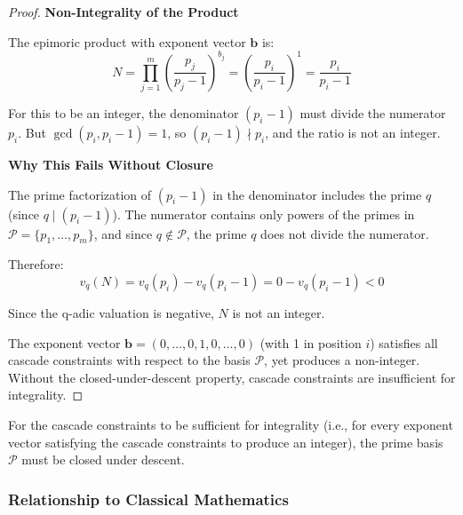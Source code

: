 \begin{proof}
\noindent \textbf{Non-Integrality of the Product}

The epimoric product with exponent vector $\mathbf{b}$ is:
\begin{equation}
N = \prod_{j=1}^m \left(\frac{p_j}{p_j - 1}\right)^{b_j} = \left(\frac{p_i}{p_i - 1}\right)^1 = \frac{p_i}{p_i - 1}
\end{equation}

For this to be an integer, the denominator $(p_i - 1)$ must divide the numerator $p_i$. But $\gcd(p_i, p_i - 1) = 1$, so $(p_i - 1) \nmid p_i$, and the ratio is not an integer.

\noindent \textbf{Why This Fails Without Closure}

The prime factorization of $(p_i - 1)$ in the denominator includes the prime $q$ (since $q \mid (p_i - 1)$). The numerator contains only powers of the primes in $\mathcal{P} = \{p_1, \ldots, p_m\}$, and since $q \notin \mathcal{P}$, the prime $q$ does not divide the numerator.

Therefore:
\begin{equation}
v_q(N) = v_q(p_i) - v_q(p_i - 1) = 0 - v_q(p_i - 1) < 0
\end{equation}

Since the q-adic valuation is negative, $N$ is not an integer.

\noindent The exponent vector $\mathbf{b} = (0, \ldots, 0, 1, 0, \ldots, 0)$ (with 1 in position $i$) satisfies all cascade constraints with respect to the basis $\mathcal{P}$, yet produces a non-integer. Without the closed-under-descent property, cascade constraints are insufficient for integrality.

\end{proof}

\begin{corollary}

For the cascade constraints to be sufficient for integrality (i.e., for every exponent vector satisfying the cascade constraints to produce an integer), the prime basis $\mathcal{P}$ must be closed under descent.

\end{corollary}

\subsubsection{Relationship to Classical Mathematics}
\label{subsubsec:classical-relationship}

